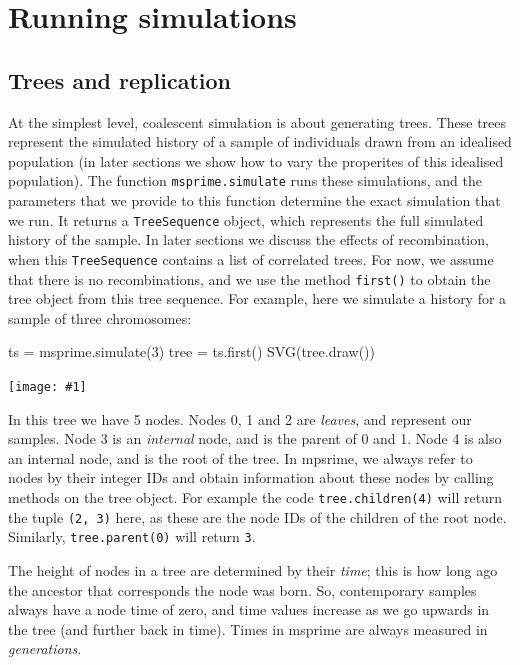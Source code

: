 \documentclass[graybox]{svmult}
\newcommand{\includenbimage}[1]{\begin{center}\texttt{[image: \#1]}\end{center}}
\begin{document}
\section{Running simulations}
\label{sec:simulations}


\subsection{Trees and replication}\label{running-simulations}
    At the simplest level, coalescent simulation is about generating trees.
These trees represent the simulated history of a sample of individuals
drawn from an idealised population (in later sections we show how to
vary the properites of this idealised population). The function
\texttt{msprime.simulate} runs these simulations, and the parameters
that we provide to this function determine the exact simulation that we
run. It returns a \texttt{TreeSequence} object, which represents the
full simulated history of the sample. In later sections we discuss the
effects of recombination, when this \texttt{TreeSequence} contains a
list of correlated trees. For now, we assume that there is no
recombinations, and we use the method \texttt{first()} to obtain the
tree object from this tree sequence. For example, here we simulate a
history for a sample of three chromosomes:

\begin{pythoncode}
ts = msprime.simulate(3)
tree = ts.first()
SVG(tree.draw())
\end{pythoncode}
\includenbimage{images/simulations_5_0.pdf}

    In this tree we have 5 nodes. Nodes 0, 1 and 2 are \emph{leaves}, and
represent our samples. Node 3 is an \emph{internal} node, and is the
parent of 0 and 1. Node 4 is also an internal node, and is the root of
the tree. In mpsrime, we always refer to nodes by their integer IDs and
obtain information about these nodes by calling methods on the tree
object. For example the code \texttt{tree.children(4)} will return the
tuple \texttt{(2,\ 3)} here, as these are the node IDs of the children
of the root node. Similarly, \texttt{tree.parent(0)} will return
\texttt{3}.

The height of nodes in a tree are determined by their \emph{time}; this
is how long ago the ancestor that corresponds the node was born. So,
contemporary samples always have a node time of zero, and time values
increase as we go upwards in the tree (and further back in time). Times
in msprime are always measured in \emph{generations}.
\end{document}

